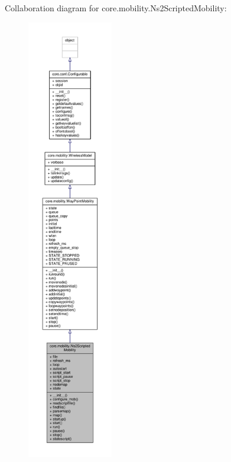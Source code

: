 Collaboration diagram for core.\+mobility.\+Ns2\+Scripted\+Mobility\+:
\nopagebreak
\begin{figure}[H]
\begin{center}
\leavevmode
\includegraphics[height=550pt]{classcore_1_1mobility_1_1_ns2_scripted_mobility__coll__graph}
\end{center}
\end{figure}
